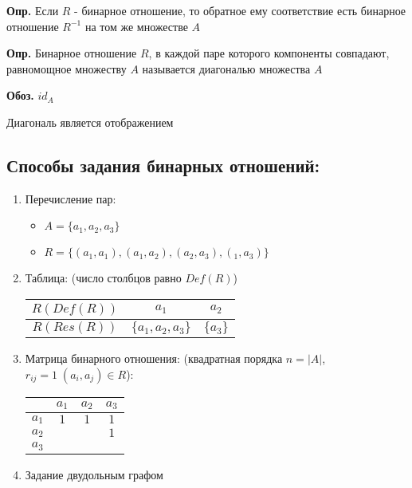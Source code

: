 \documentclass[10pt]{article}
\begin{document}
\par\textbf{Опр.} Если $R$ - бинарное отношение, то обратное ему соответствие есть бинарное отношение $R^{-1}$ на том же множестве $A$
\par\textbf{Опр.} Бинарное отношение $R$, в каждой паре которого компоненты совпадают, равномощное множеству $A$ называется диагональю множества $A$
\par\textbf{Обоз.} $id_A$
\par Диагональ является отображением
\subsection*{Способы задания бинарных отношений:}
\begin{enumerate}
    \item Перечисление пар:
        \begin{itemize}
            \item $A = \{ a_1, a_2, a_3 \}$
            \item $R = \{ (a_1, a_1), (a_1, a_2), (a_2, a_3), (_1, a_3) \}$
        \end{itemize}
    \item Таблица: (число столбцов равно $Def(R)$)
        \par \begin{tabular}{|c|c|c|}
            \hline
            $R(Def(R))$ & $a_1$ & $a_2$ \\
            \hline
            $R(Res(R))$ & $\{ a_1, a_2, a_3\}$ & $\{ a_3 \}$ \\
            \hline
        \end{tabular}
    \item Матрица бинарного отношения: (квадратная порядка $n = |A|$, $r_{ij} = 1 \; (a_i, a_j) \in R$):
        \par \begin{tabular}{|c|c|c|c|}
            \hline
             & $a_1$ & $a_2$ & $a_3$ \\
            \hline
            $a_1$ & $1$ & $1$ & $1$ \\
            \hline
            $a_2$ & & & $1$ \\
            \hline
            $a_3$ & & & \\
            \hline
        \end{tabular}
    \item Задание двудольным графом
\end{enumerate}
\end{document}
